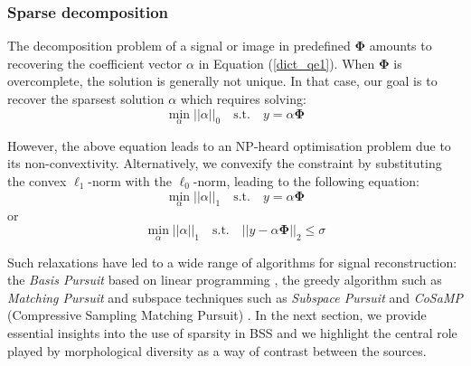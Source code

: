 \subsubsection{Sparse decomposition}
\label{BSS_sparse_decomp}
The decomposition problem of a signal or image in predefined $\mathbf{\Phi}$ amounts to recovering the coefficient vector $\alpha$ in Equation (\ref{dict_qe1}). When $\mathbf{\Phi}$ is overcomplete, the solution is generally not unique. In that case, our goal is to recover the sparsest solution $\alpha$ which requires solving:
\begin{equation}
    \min_{\alpha}||\alpha||_0 \quad \text{s.t.} \quad y = \alpha \mathbf{\Phi}
\end{equation}

However, the above equation leads to an NP-heard optimisation problem due to its non-convextivity. Alternatively, we convexify the constraint by substituting the convex $\ell_1$-norm with the $\ell_0$-norm, leading to the following equation:
\begin{equation}
    \min_{\alpha} ||\alpha||_1 \quad \text{s.t.} \quad y = \alpha \mathbf{\Phi} 
    \label{l1_sparse}
\end{equation}
or\\
\begin{equation}
    \min_{\alpha}||\alpha||_1 \quad \text{s.t.} \quad || y - \alpha \mathbf{\Phi}||_2 \leq \sigma
\end{equation}

Such relaxations have led to a wide range of algorithms for signal reconstruction: the \textit{Basis Pursuit} based on linear programming  \cite{BPAtomicDcomp}, the greedy algorithm such as \textit{Matching Pursuit} \cite{Mallat_Zhang1993} and subspace techniques such as \textit{Subspace Pursuit} \cite{WdaiSP} and \textit{CoSaMP} (Compressive
Sampling Matching Pursuit) \cite{CoSaMP2008}. In the next section, we provide essential insights into the use of sparsity in BSS and we highlight the central role played by morphological diversity as a way of contrast between the sources.


